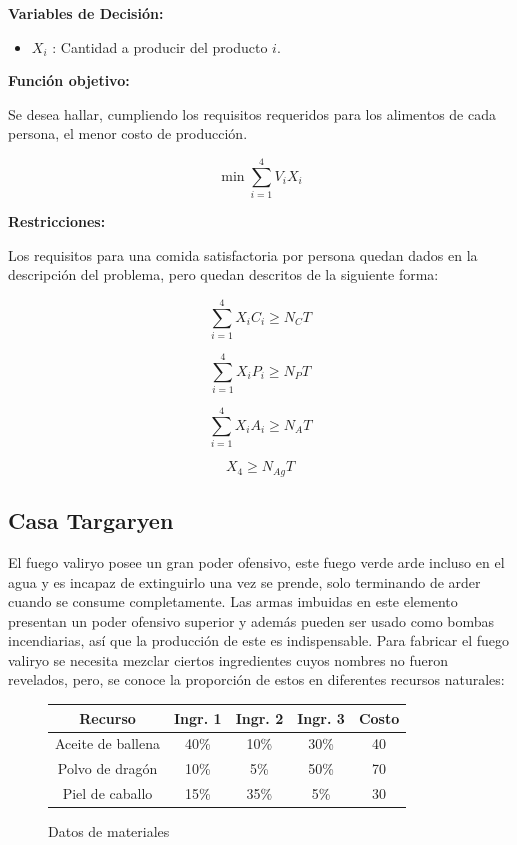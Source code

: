 \documentclass[a4paper,10pt,twocolumn]{article}
\theoremstyle{theorem}
\theoremstyle{definition}
\theoremstyle{remark}
\begin{document}
\textbf{Variables de Decisi\'on:}

\begin{itemize}

\item $X_{i}$ : Cantidad a producir del producto $i$.

\end{itemize}

\textbf{Funci\'on objetivo:}

Se desea hallar, cumpliendo los requisitos requeridos para los alimentos de cada persona, el menor costo de producci\'on.

$$
\min \sum^{4}_{i=1} V_{i}X_{i}
$$

\textbf{Restricciones:}

Los requisitos para una comida satisfactoria por persona quedan dados en la descripci\'on del problema, pero quedan descritos de la siguiente forma:

$$
\sum^{4}_{i=1} X_{i} C_{i} \geq N_{C} T
$$

$$
\sum^{4}_{i=1} X_{i} P_{i} \geq N_{P} T
$$

$$
\sum^{4}_{i=1} X_{i} A_{i} \geq N_{A} T
$$

$$
X_{4} \geq N_{Ag} T
$$


	\subsection{Casa Targaryen}\label{subsec:ejer_3}
El fuego valiryo posee un gran poder ofensivo, este fuego verde arde incluso en el agua y es incapaz de extinguirlo una vez se prende, solo terminando de arder cuando se consume completamente. Las armas imbuidas en este elemento presentan un poder ofensivo superior y además pueden ser usado como bombas incendiarias, así que la producción de este es indispensable. Para fabricar el fuego valiryo se necesita mezclar ciertos ingredientes cuyos nombres no fueron revelados, pero, se conoce la proporción de estos en diferentes recursos naturales:

\begin{figure}[h!]%
	\begin{center}
		\begin{tabular}{|c|c|c|c|c|} \hline
		Recurso				& Ingr. 1 & Ingr. 2 	& Ingr. 3   & Costo  \\ \hline
		Aceite de ballena	& 40\%			& 10\%				& 30\%			  & 40		\\ \hline
		Polvo de dragón		& 10\%			&  5\%				& 50\%	  		  & 70		\\ \hline
		Piel de caballo		& 15\%			& 35\%				&  5\%	  		  & 30		\\ \hline
		\end{tabular}
	\caption{Datos de materiales}\label{fig:ejer_3}
	\end{center}
\end{figure}
\end{document}
